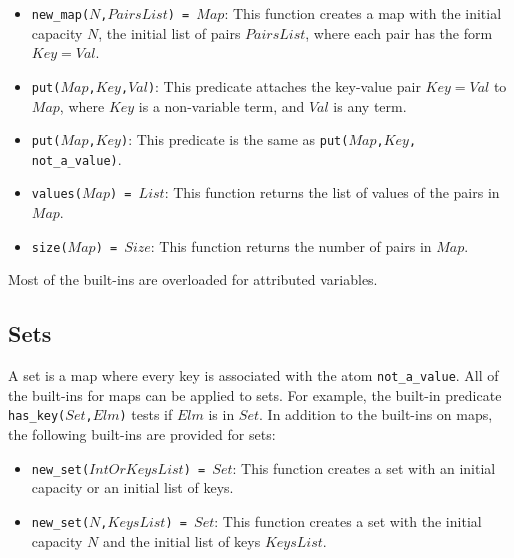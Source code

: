 \begin{itemize}
\item \texttt{new\_map($N$,$PairsList$) = $Map$}: This function creates a map with the initial capacity $N$, the initial list of pairs $PairsList$, where each pair has the form \texttt{$Key$$=$$Val$}.
\item \texttt{put($Map$,$Key$,$Val$)}: This predicate attaches the key-value pair \texttt{$Key$$=$$Val$} to \texttt{$Map$}, where \texttt{$Key$} is a non-variable term, and \texttt{$Val$} is any term. 
\item \texttt{put($Map$,$Key$)}: This predicate is the same as \texttt{put($Map$,$Key$, not\_a\_value)}.
\item \texttt{values($Map$) = $List$}: This function returns the list of values of the pairs in $Map$.
\item \texttt{size($Map$) = $Size$}: This function returns the number of pairs in $Map$.
\end{itemize}
Most of the built-ins are overloaded for attributed variables.

\subsection{Sets}
A set is a map where every key is associated with the atom \texttt{not\_a\_value}. All of the built-ins for maps can be applied to sets. For example, the built-in predicate \texttt{has\_key($Set$,$Elm$)} tests if $Elm$ is in $Set$. In addition to the built-ins on maps, the following built-ins are provided for sets:
\begin{itemize}
\item \texttt{new\_set($IntOrKeysList$) = $Set$}: This function creates a set with an initial capacity or an initial list of keys.
\item \texttt{new\_set($N$,$KeysList$) = $Set$}: This function creates a set with the initial capacity $N$ and the initial list of keys $KeysList$.
\end{itemize}

